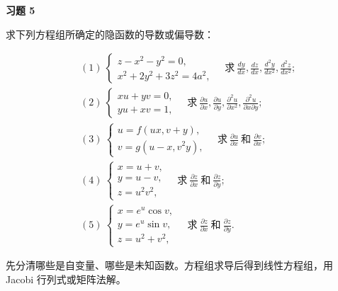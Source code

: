 \begin{exercisebox}
\textbf{习题 5}

求下列方程组所确定的隐函数的导数或偏导数：

\[
      \begin{aligned}
      &(1)\ \begin{cases}
      z-x^2-y^2=0,\\
      x^2+2y^2+3z^2=4a^2,
      \end{cases}
      \quad \text{求}\ \frac{dy}{dx},\frac{dz}{dx},\frac{d^2y}{dx^2},\frac{d^2z}{dx^2};\\
      &(2)\ \begin{cases}
      xu+yv=0,\\
      yu+xv=1,
      \end{cases}
      \quad \text{求}\ \frac{\partial u}{\partial x},\frac{\partial u}{\partial y},
      \frac{\partial^2u}{\partial x^2},\frac{\partial^2u}{\partial x\partial y};\\
      &(3)\ \begin{cases}
      u=f(ux,v+y),\\
      v=g(u-x,v^2y),
      \end{cases}
      \quad \text{求}\ \frac{\partial u}{\partial x}\ \text{和}\ \frac{\partial v}{\partial x};\\
      &(4)\ \begin{cases}
      x=u+v,\\
      y=u-v,\\
      z=u^2v^2,
      \end{cases}
      \quad \text{求}\ \frac{\partial z}{\partial x}\ \text{和}\ \frac{\partial z}{\partial y};\\
      &(5)\ \begin{cases}
      x=e^u\cos v,\\
      y=e^u\sin v,\\
      z=u^2+v^2,
      \end{cases}
      \quad \text{求}\ \frac{\partial z}{\partial x}\ \text{和}\ \frac{\partial z}{\partial y}.
      \end{aligned}
      \]

\begin{hintbox}
先分清哪些是自变量、哪些是未知函数。方程组求导后得到线性方程组，用 Jacobi 行列式或矩阵法解。
\end{hintbox}
\end{exercisebox}

